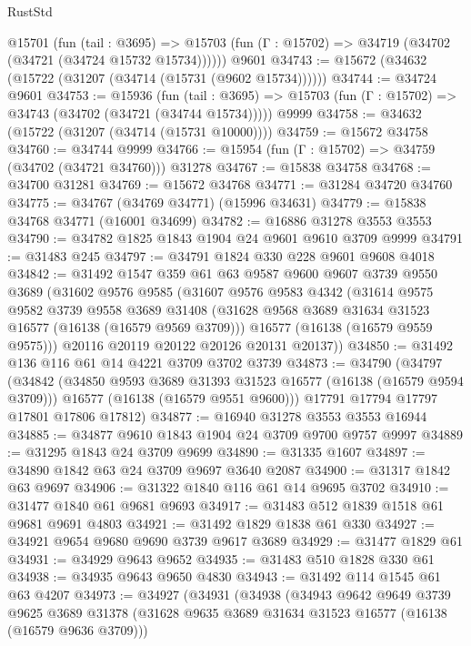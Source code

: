 \begin{lexlean}{RustStd}
\begin{coremodule}
    @15701
      (fun (tail : @3695) =>
      @15703 (fun (Γ : @15702) => @34719 (@34702 (@34721 (@34724 @15732 @15734))))))
    @9601
@34743 := @15672 (@34632 (@15722 (@31207 (@34714 (@15731 (@9602 @15734))))))
@34744 := @34724 @9601
@34753 := @15936
    (fun (tail : @3695) => @15703 (fun (Γ : @15702) => @34743 (@34702 (@34721 (@34744 @15734)))))
    @9999
@34758 := @34632 (@15722 (@31207 (@34714 (@15731 @10000))))
@34759 := @15672 @34758
@34760 := @34744 @9999
@34766 := @15954 (fun (Γ : @15702) => @34759 (@34702 (@34721 @34760))) @31278
@34767 := @15838 @34758
@34768 := @34700 @31281
@34769 := @15672 @34768
@34771 := @31284 @34720 @34760
@34775 := @34767 (@34769 @34771) (@15996 @34631)
@34779 := @15838 @34768 @34771 (@16001 @34699)
@34782 := @16886 @31278 @3553 @3553
@34790 := @34782 @1825 @1843 @1904 @24 @9601 @9610 @3709 @9999
@34791 := @31483 @245
@34797 := @34791 @1824 @330 @228 @9601 @9608 @4018
@34842 := @31492
    @1547
    @359
    @61
    @63
    @9587
    @9600
    @9607
    @3739
    @9550
    @3689
    (@31602
      @9576
      @9585
      (@31607
        @9576
        @9583
        @4342
        (@31614
          @9575
          @9582
          @3739
          @9558
          @3689
          @31408
          (@31628 @9568 @3689 @31634 @31523 @16577 (@16138 (@16579 @9569 @3709)))
          @16577
          (@16138 (@16579 @9559 @9575)))
        @20116
        @20119
        @20122
        @20126
        @20131
        @20137))
@34850 := @31492 @136 @116 @61 @14 @4221 @3709 @3702 @3739
@34873 := @34790
    (@34797
      (@34842
        (@34850 @9593 @3689 @31393 @31523 @16577 (@16138 (@16579 @9594 @3709)))
        @16577
        (@16138 (@16579 @9551 @9600)))
      @17791
      @17794
      @17797
      @17801
      @17806
      @17812)
@34877 := @16940 @31278 @3553 @3553 @16944
@34885 := @34877 @9610 @1843 @1904 @24 @3709 @9700 @9757 @9997
@34889 := @31295 @1843 @24 @3709 @9699
@34890 := @31335 @1607
@34897 := @34890 @1842 @63 @24 @3709 @9697 @3640 @2087
@34900 := @31317 @1842 @63 @9697
@34906 := @31322 @1840 @116 @61 @14 @9695 @3702
@34910 := @31477 @1840 @61 @9681 @9693
@34917 := @31483 @512 @1839 @1518 @61 @9681 @9691 @4803
@34921 := @31492 @1829 @1838 @61 @330
@34927 := @34921 @9654 @9680 @9690 @3739 @9617 @3689
@34929 := @31477 @1829 @61
@34931 := @34929 @9643 @9652
@34935 := @31483 @510 @1828 @330 @61
@34938 := @34935 @9643 @9650 @4830
@34943 := @31492 @114 @1545 @61 @63 @4207
@34973 := @34927
    (@34931
      (@34938
        (@34943
          @9642
          @9649
          @3739
          @9625
          @3689
          @31378
          (@31628 @9635 @3689 @31634 @31523 @16577 (@16138 (@16579 @9636 @3709)))

\end{coremodule}
\end{lexlean}
